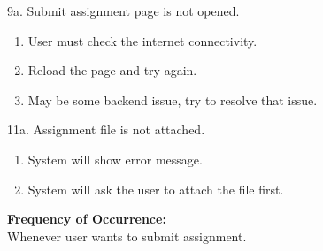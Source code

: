 \documentclass[12pt]{article}
\begin{document}
9a. Submit assignment page is not opened.
\begin{enumerate}
\item User must check the internet connectivity.
\item Reload the page and try again.
\item May be some backend issue, try to resolve that issue.
\end{enumerate}
11a. Assignment file is not attached.
\begin{enumerate}
\item System will show error message.
\item System will ask the user to attach the file first.
\end{enumerate}
\textbf{Frequency of Occurrence:}\\
Whenever user wants to submit assignment.
\end{document}
